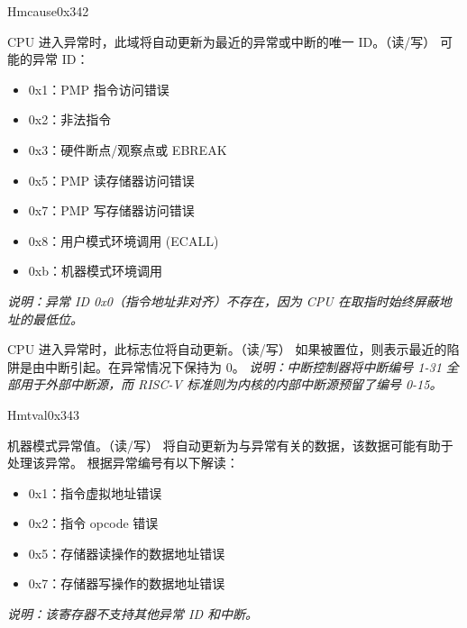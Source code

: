 \begin{register}{H}{mcause}{0x342}\label{regdesc:MCAUSE}
%
%
%
\regnewline%
\begin{regdesc}\begin{reglist}
\label{fielddesc:MCAUSECODE}\item [Exception Code] CPU 进入异常时，此域将自动更新为最近的异常或中断的唯一 ID。（读/写）
\newline 可能的异常 ID：
\begin{itemize}
    \setlength\itemsep{-1em}
    \item 0x1：PMP 指令访问错误
    \item 0x2：非法指令
    \item 0x3：硬件断点/观察点或 EBREAK
    \item 0x5：PMP 读存储器访问错误
    \item 0x7：PMP 写存储器访问错误
    \item 0x8：用户模式环境调用 (ECALL)
    \item 0xb：机器模式环境调用
\end{itemize}
\textit {说明：异常 ID 0x0（指令地址非对齐）不存在，因为 CPU 在取指时始终屏蔽地址的最低位。}
\label{fielddesc:MCAUSEINT}\item [Interrupt Flag] CPU 进入异常时，此标志位将自动更新。（读/写） \newline 如果被置位，则表示最近的陷阱是由中断引起。在异常情况下保持为 0。 \newline \textit{说明：中断控制器将中断编号 1-31 全部用于外部中断源，而 RISC-V 标准则为内核的内部中断源预留了编号 0-15。}
\end{reglist}\end{regdesc}
\end{register}

\begin{register}{H}{mtval}{0x343}\label{regdesc:MTVAL}
%
\regnewline%
\begin{regdesc}\begin{reglist}
\label{fielddesc:MTVAL}\item [MTVAL] 机器模式异常值。（读/写） \newline 将自动更新为与异常有关的数据，该数据可能有助于处理该异常。
\newline 根据异常编号有以下解读：
\begin{itemize}
    \setlength\itemsep{-1em}
    \item 0x1：指令虚拟地址错误
    \item 0x2：指令 opcode 错误
    \item 0x5：存储器读操作的数据地址错误
    \item 0x7：存储器写操作的数据地址错误
\end{itemize}
\textit {说明：该寄存器不支持其他异常 ID 和中断。}
\end{reglist}\end{regdesc}
\end{register}

